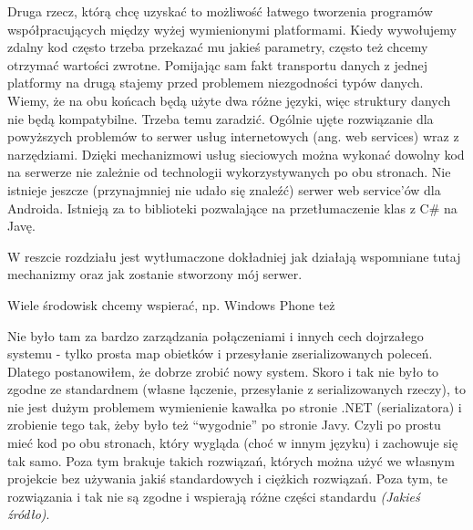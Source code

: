 Druga rzecz, którą chcę uzyskać to możliwość łatwego tworzenia programów współpracujących między wyżej wymienionymi platformami. Kiedy wywołujemy zdalny kod często trzeba przekazać mu jakieś parametry, często też chcemy otrzymać wartości zwrotne. Pomijając sam fakt transportu danych z jednej platformy na drugą stajemy przed problemem niezgodności typów danych. Wiemy, że na obu końcach będą użyte dwa różne języki, więc struktury danych nie będą kompatybilne. Trzeba temu zaradzić.
Ogólnie ujęte rozwiązanie dla powyższych problemów to serwer usług internetowych (ang. web services) wraz z narzędziami. Dzięki mechanizmowi usług sieciowych można wykonać dowolny kod na serwerze nie zależnie od technologii wykorzystywanych po obu stronach. Nie istnieje jeszcze (przynajmniej nie udało się znaleźć) serwer web service’ów dla Androida. Istnieją za to biblioteki pozwalające na przetłumaczenie klas z C\# na Javę.

W reszcie rozdziału jest wytłumaczone dokładniej jak działają wspomniane tutaj mechanizmy oraz jak zostanie stworzony mój serwer.

Wiele środowisk chcemy wspierać, np. Windows Phone też

Nie było tam za bardzo zarządzania połączeniami i innych cech dojrzałego systemu - tylko prosta map obietków i przesyłanie zserializowanych poleceń. Dlatego postanowiłem, że dobrze zrobić nowy system. Skoro i tak nie było to zgodne ze standardnem (własne łączenie, przesyłanie z serializowanych rzeczy), to nie jest dużym problemem wymienienie kawałka po stronie .NET (serializatora) i zrobienie tego tak, żeby było też ``wygodnie'' po stronie Javy. Czyli po prostu mieć kod po obu stronach, który wygląda (choć w innym języku) i zachowuje się tak samo. Poza tym brakuje takich rozwiązań, których można użyć we własnym projekcie bez używania jakiś standardowych i ciężkich rozwiązań. Poza tym, te rozwiązania i tak nie są zgodne i wspierają różne części standardu \emph{(Jakieś źródło)}.

